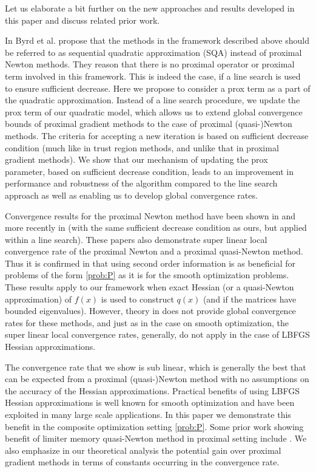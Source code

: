 \documentclass[11pt]{article}
\numberwithin{equation}{section}
\begin{document}
Let us elaborate a bit further on the new approaches and results developed in this paper and discuss related prior work. 

In \cite{Byrdetal2013} Byrd et al. propose that the methods in the framework  described above should be referred to as sequential quadratic approximation (SQA) instead of proximal Newton methods.  They reason that there is no proximal operator or proximal term involved in this framework. This is indeed the case, if a line search is used to ensure sufficient decrease. Here we propose to consider a prox term as a part of the quadratic approximation. 
Instead of a line search procedure, we update the prox term of our quadratic model, which allows us to extend global convergence bounds of proximal gradient methods to the case of proximal (quasi-)Newton methods. The criteria for accepting a new iteration is based on sufficient decrease condition (much like in trust region methods, and unlike that in proximal gradient methods).
We show that our mechanism of updating the prox parameter, based on sufficient decrease condition, leads to an improvement in performance and robustness of the algorithm compared to the line search approach as well as enabling us to develop global convergence rates. 

Convergence results for the proximal Newton method have been shown 
in \cite{Saundersetal} and more recently in \cite{Byrdetal2013} (with the same sufficient decrease condition as ours, but applied within a line search). These papers also demonstrate super linear local convergence rate of the proximal Newton and a proximal quasi-Newton method.
Thus it is confirmed in \cite{Byrdetal2013, Saundersetal} that using second order information is as beneficial for problems of the form  \eqref{prob:P}
as it is for the smooth optimization problems.  These results apply to our framework when exact Hessian (or a quasi-Newton approximation) of $f(x)$ is used to construct $q(x)$ (and if the matrices have bounded eigenvalues).  However, theory in \cite{Byrdetal2013, Saundersetal}
does not provide global convergence rates for these methods, and  just as in the case on smooth optimization,
the super linear local convergence rates, generally,  do not apply in the case of LBFGS Hessian approximations. 

The convergence rate that we show is sub linear, which is generally the best that can be expected from a proximal (quasi-)Newton method
 with no assumptions on the accuracy of the Hessian approximations.  Practical benefits of using 
LBFGS Hessian approximations is well known for smooth optimization \cite{NoceWrig06} and have been exploited in many large scale applications. 
In this paper we demonstrate this benefit in the composite optimization setting \eqref{prob:P}. Some prior work showing benefit of limiter memory quasi-Newton method in proximal setting include \cite{BeckerNIPS2012, Jiangetal2012}. 
We also emphasize  in our theoretical analysis the potential gain over proximal gradient methods in terms of constants occurring in the convergence rate. 
\end{document}
